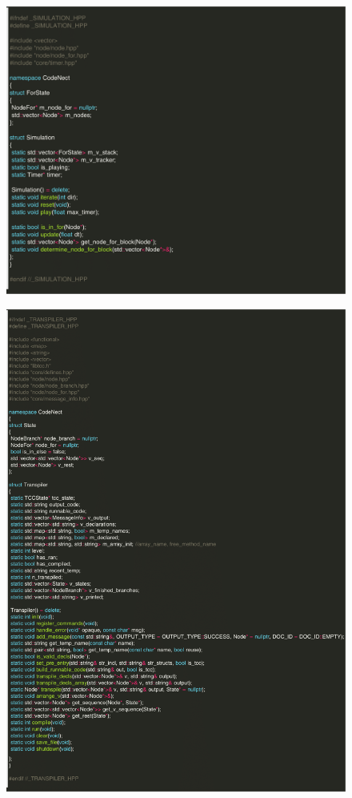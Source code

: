 \begin{figure}[H]
	 \centering
	 \includegraphics[width=\textwidth]{figures/code/simulation.png}
\end{figure}
\begin{figure}[H]
	 \centering
	 \includegraphics[width=\textwidth]{figures/code/transpiler.png}
\end{figure}

